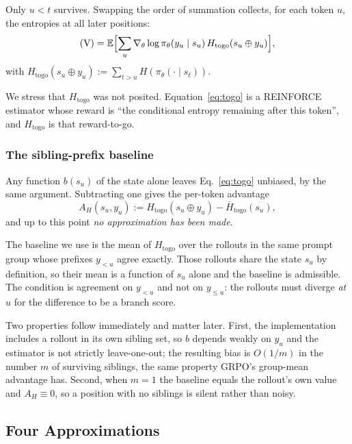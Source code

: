 \documentclass[11pt]{article}
\newcommand{\Htogo}{H_{\mathrm{togo}}}
\newcommand{\AH}{A_{H}}
\newcommand{\E}{\mathbb{E}}
\newcommand{\gradt}{\nabla_{\theta}}
\newcommand{\pit}{\pi_{\theta}}
\begin{document}
Only $u < t$ survives. Swapping the order of summation collects, for each token
$u$, the entropies at all later positions:
%
\begin{equation}
(\mathrm{V}) = \E\Bigl[\sum_u \gradt \log \pit(y_u \mid s_u)\,
\Htogo(s_u \oplus y_u)\Bigr],
\label{eq:togo-app}
\end{equation}
%
with $\Htogo(s_u \oplus y_u) := \sum_{t > u} H(\pit(\cdot \mid s_t))$.

We stress that $\Htogo$ was not posited. Equation~\eqref{eq:togo} is a REINFORCE
estimator whose reward is ``the conditional entropy remaining after this token'',
and $\Htogo$ is that reward-to-go.

\subsubsection{The sibling-prefix baseline}

Any function $b(s_u)$ of the state alone leaves Eq.~\eqref{eq:togo} unbiased, by the
same argument. Subtracting one gives the per-token advantage
%
\begin{equation}
\AH(s_u, y_u) := \Htogo(s_u \oplus y_u) - \bar{H}_{\mathrm{togo}}(s_u),
\label{eq:ah-app}
\end{equation}
%
and up to this point \emph{no approximation has been made}.

The baseline we use is the mean of $\Htogo$ over the rollouts in the same prompt
group whose prefixes $y_{<u}$ agree exactly. Those rollouts share the state $s_u$ by
definition, so their mean is a function of $s_u$ alone and the baseline is
admissible. The condition is agreement on $y_{<u}$ and not on $y_{\le u}$: the
rollouts must diverge \emph{at} $u$ for the difference to be a branch score.

Two properties follow immediately and matter later. First, the implementation
includes a rollout in its own sibling set, so $b$ depends weakly on $y_u$ and the
estimator is not strictly leave-one-out; the resulting bias is $O(1/m)$ in the
number $m$ of surviving siblings, the same property GRPO's group-mean advantage
has. Second, when $m = 1$ the baseline equals the rollout's own value and
$\AH \equiv 0$, so a position with no siblings is silent rather than noisy.

\subsection{Four Approximations}
\label{sec:approx}
\end{document}
